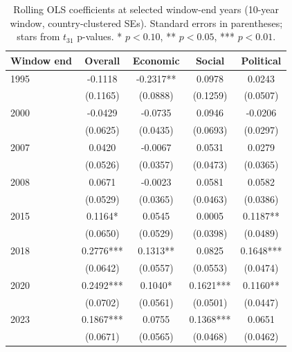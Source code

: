 \begin{table}
\caption{Rolling OLS coefficients at selected window-end years (10-year window, country-clustered SEs). Standard errors in parentheses; stars from $t_{31}$ p-values. * $p<0.10$, ** $p<0.05$, *** $p<0.01$.}
\label{tab:rolling_snapshots}
\begin{tabular}{lcccc}
\toprule
Window end & Overall & Economic & Social & Political \\
\midrule
1995 & -0.1118 & -0.2317** & 0.0978 & 0.0243 \\
 & (0.1165) & (0.0888) & (0.1259) & (0.0507) \\
2000 & -0.0429 & -0.0735 & 0.0946 & -0.0206 \\
 & (0.0625) & (0.0435) & (0.0693) & (0.0297) \\
2007 & 0.0420 & -0.0067 & 0.0531 & 0.0279 \\
 & (0.0526) & (0.0357) & (0.0473) & (0.0365) \\
2008 & 0.0671 & -0.0023 & 0.0581 & 0.0582 \\
 & (0.0529) & (0.0365) & (0.0463) & (0.0386) \\
2015 & 0.1164* & 0.0545 & 0.0005 & 0.1187** \\
 & (0.0650) & (0.0529) & (0.0398) & (0.0489) \\
2018 & 0.2776*** & 0.1313** & 0.0825 & 0.1648*** \\
 & (0.0642) & (0.0557) & (0.0553) & (0.0474) \\
2020 & 0.2492*** & 0.1040* & 0.1621*** & 0.1160** \\
 & (0.0702) & (0.0561) & (0.0501) & (0.0447) \\
2023 & 0.1867*** & 0.0755 & 0.1368*** & 0.0651 \\
 & (0.0671) & (0.0565) & (0.0468) & (0.0462) \\
\bottomrule
\end{tabular}
\end{table}
